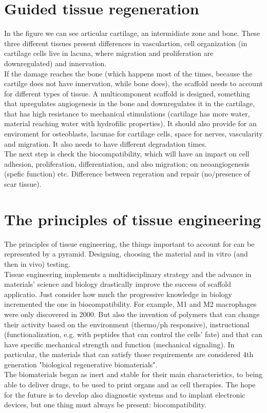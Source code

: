 \section{Guided tissue regeneration}
In the figure we can see articular cartilage, an intermidiate zone and bone. These three different tissues present differences in vasculartion, cell organization (in cartilage cells live in lacuna, where migration and proliferation are downregulated) and innervation. 
\\
If the damage reaches the bone (which happens most of the times, because the cartilge does not have innervation, while bone does), the scaffold needs to account for different types of tissue. A multicomponent scaffold is designed, something that upregulates angiogenesis in the bone and downregulates it in the cartilage, that has high resistance to mechanical stimulations (cartilage has more water, material reaching water with hydrofilic properties). It should also provide for an enviroment for osteoblasts, lacunae for cartilage cells, space for nerves, vascularity and migration. It also needs to have different degradation times. 
\\
The next step is check the biocompatibility, which will have an impact on cell adhesion, proliferation, differentiation, and also migration; on neoangiogenesis (spefic function) etc. Difference between regeration and repair (no/presence of scar tissue). 

\section{The principles of tissue engineering}
The principles of tissue engineering, the things important to account for can be represented by a pyramid. Designing, choosing the material and in vitro (and then in vivo) testing. \\
Tissue engineering implements a multidisciplinary strategy and the advance in materials' science and biology drastically improve the success of scaffold applicatio. Just consider how much the progressive knowledge in biology incremented the one in biocompatibility. For example, M1 and M2 macrophages were only discovered in 2000. But also the invention of polymers that can change their activity based on the environment (thermo/ph responsive), instructional (functionalization, e.g. with peptides that can control the cells' fate) and that can have specific mechanical strength and function (mechanical signaling). In particular, the materials that can satisfy those requirements are considered 4th generation "biological regenerative biomaterials".
\\
The biomaterials began as inert and stable for their main characteristics, to being able to deliver drugs, to be used to print organs and as cell therapies. The hope for the future is to develop also diagnostic systems and to implant electronic devices, but one thing must always be present: biocompatibility. 

